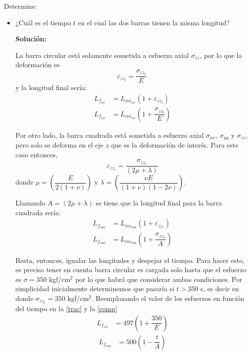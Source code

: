 \documentclass[../notas medios.tex]{subfiles}
\begin{document}
Determine:
\begin{itemize}
\item ¿Cuál es el tiempo $t$ en el cual las dos barras tienen la misma longitud?

\textbf{Solución:}

La barra circular está solamente sometida a esfuerzo axial $\sigma_{zz}$, por lo que la deformación es
\[\varepsilon _{zz_t} = \dfrac{\sigma_{zz_t} }{E}\, \]
y la longitud final sería:
\begin{equation}
  \begin{split}
  L_{f_{cir}} & = L_{ini_{cir}} (1 +  \varepsilon_{zz_t} )\\
  L_{f_{cir}} & = L_{ini_{cir}} \left(1+  \dfrac{\sigma_{zz_t} }{E}\right)
  \end{split}
  \label{trac}
\end{equation}

Por otro lado, la barra cuadrada está sometida a esfuerzo axial $\sigma_{xx}$, $\sigma_{yy}$ y $\sigma_{zz}$, pero solo se deforma en el eje $z$ que es la deformación de interés. Para este caso entonces,
\[\varepsilon _{zz_c} = \dfrac{\sigma_{zz_c} }{(2 \mu + \lambda)}\]
donde $\mu =   \left(\dfrac{E }{2(1 + \nu)}\right)$  y $\lambda =   \left(\dfrac{\nu{E} }{(1 + \nu) (1 - 2\nu)}\right)$.

Llamando $A = (2 \mu + \lambda)$ se tiene que la longitud final para la barra cuadrada sería:
\begin{equation}
  \begin{split}
  L_{f_{cua}} & = L_{ini_{cua}} (1 +  \varepsilon_{zz_c}) \\
  L_{f_{cua}} & = L_{ini_{cua}} \left(1 +  \dfrac{\sigma_{zz_c} }{A}\right)
  \end{split}
\label{comp}
\end{equation}

Resta, entonces, igualar las longitudes y despejar el tiempo. Para hacer esto, es preciso tener en cuenta barra circular es cargada solo hasta que el esfuerzo es $\sigma=350$ kgf/cm$^2$ por lo que habrá que considerar ambas condiciones. Por simplicidad inicialmente determinemos que pasaría si $t > 350$ s, es decir en donde $\sigma_{zz_t} = 350$  kgf/cm$^2$. Reemplazando el valor de los esfuerzos en función del tiempo en la \cref {trac} y la  \cref{comp}
\begin{equation}
  \begin{split}
  L_{f_{cir}} & = 497 \left(1 +  \dfrac{350 }{E}\right)
  \end{split}
  \label{trac2}
\end{equation}
\begin{equation}
  \begin{split}
  L_{f_{cua}} & = 500 \left(1 - \dfrac{t }{A}\right)
  \end{split}
  \label{comp2}
\end{equation}


\end{itemize}
\end{document}
